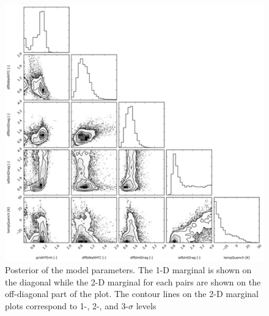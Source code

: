 \documentclass[11pt,titlepage]{article}
\begin{document}
\begin{figure}[h!]
	\centering
	\includegraphics[scale=0.95]{figures/mcmc.png}
	\caption{Posterior of the model parameters. The 1-D marginal is shown on 
	    the diagonal while the 2-D marginal for each pairs are shown on the 
	    off-diagonal part of the plot. The contour lines on the 2-D marginal
	    plots correspond to 1-, 2-, and 3-$\sigma$ levels}
	\label{fig:mcmc}
\end{figure}
\end{document}
